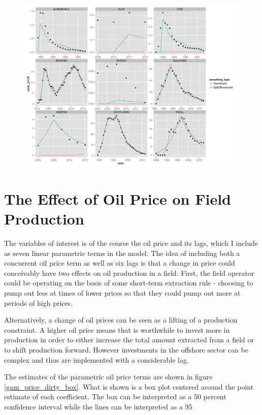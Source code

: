 \documentclass[12pt]{scrartcl} %
\begin{document}
\begin{figure}
	\includegraphics[width=.8\textwidth]{bench_vs_split.png}
	\caption{}
	\label{bench_vs_split}
\end{figure}

\section{The Effect of Oil Price on Field Production}

The variables of interest is of the course the oil price and its lags, which I include as seven linear parametric terms in the model.  The idea of including both a concurrent oil price term as well as six lags is that a change in price could conceivably have two effects on oil production in a field.  First, the field operator could be operating on the basis of some short-term extraction rule - choosing to pump out less at times of lower prices so that they could pump out more at periods of high prices.  

Alternatively, a change of oil prices can be seen as a lifting of a production constraint.  A higher oil price means that is worthwhile to invest more in production in order to either increase the total amount extracted from a field or to shift production forward.  However investments in the offshore sector can be complex and thus are implemented with a considerable lag.  

The estimates of the parametric oil price terms are shown in figure \ref{gam_price_dirty_box}.  What is shown is a box plot centered around the point estimate of each coefficient.  The box can be interpreted as a 50 percent confidence interval while the lines can be interpreted as a 95%
\end{document}

